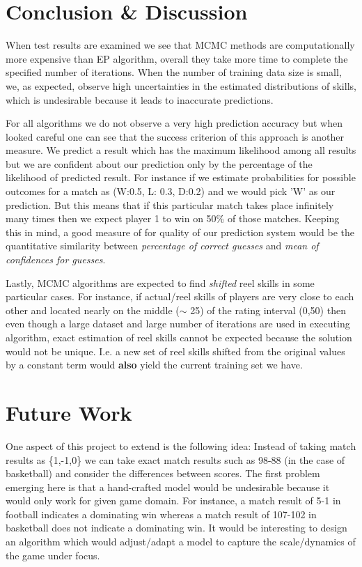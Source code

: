 \documentclass[12pt]{article}
\begin{document}
\section{Conclusion \& Discussion}
When test results are examined we see that MCMC methods are computationally more expensive than EP algorithm, overall they take more time to complete the specified number of iterations. When the number of training data size is small, we, as expected, observe high uncertainties in the estimated distributions of skills, which is undesirable because it leads to inaccurate predictions. 

For all algorithms we do not observe a very high prediction accuracy but when looked careful one can see that the success criterion of this approach is another measure. We predict a result which has the maximum likelihood among all results but we are confident about our prediction only by the percentage of the likelihood of predicted result. For instance if we estimate probabilities for possible outcomes for a match as (W:0.5, L: 0.3, D:0.2) and we would pick 'W' as our prediction. But this means that if this particular match takes place infinitely many times then we expect player 1 to win on 50\% of those matches. Keeping this in mind, a good measure of for quality of our prediction system would be the quantitative similarity between \textit{percentage of correct guesses} and \textit{mean of confidences for guesses}.

Lastly, MCMC algorithms are expected to find \textit{shifted} reel skills in some particular cases. For instance, if actual/reel skills of players are very close to each other and located nearly on the middle ($\sim$ 25) of the rating interval (0,50) then even though a large dataset and large number of iterations are used in executing algorithm, exact estimation of reel skills cannot be expected because the solution would not be unique. I.e. a new set of reel skills shifted from the original values by a constant term would \textbf{also} yield the current training set we have.

\section{Future Work}
One aspect of this project to extend is the following idea: Instead of taking match results as \{1,-1,0\} we can take exact match results such as 98-88 (in the case of basketball) and consider the differences between scores. The first problem emerging here is that a hand-crafted model would be undesirable because it would only work for given game domain. For instance, a match result of 5-1 in football indicates a dominating win whereas a match result of 107-102 in basketball does not indicate a dominating win. It would be interesting to design an algorithm which would adjust/adapt a model to capture the scale/dynamics of the game under focus.
\end{document}
